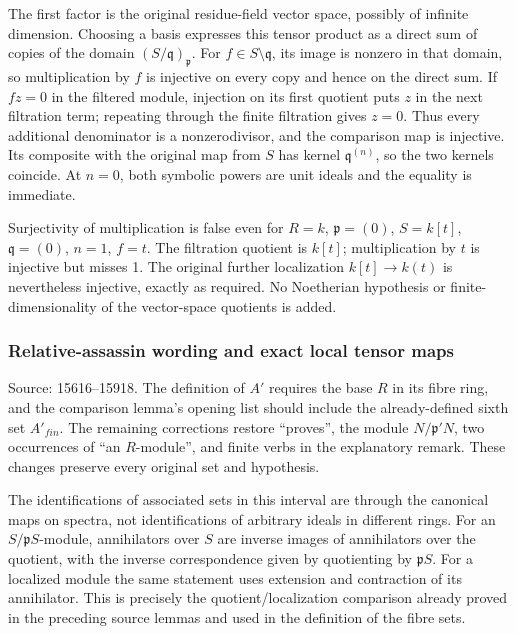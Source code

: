 The first factor is the original residue-field vector space, possibly of infinite dimension. Choosing a basis expresses this tensor product as a direct sum of copies of the domain \((S/\mathfrak q)_{\mathfrak p}\). For \(f\in S\setminus\mathfrak q\), its image is nonzero in that domain, so multiplication by \(f\) is injective on every copy and hence on the direct sum. If \(fz=0\) in the filtered module, injection on its first quotient puts \(z\) in the next filtration term; repeating through the finite filtration gives \(z=0\). Thus every additional denominator is a nonzerodivisor, and the comparison map is injective. Its composite with the original map from \(S\) has kernel \(\mathfrak q^{(n)}\), so the two kernels coincide. At \(n=0\), both symbolic powers are unit ideals and the equality is immediate.

Surjectivity of multiplication is false even for \(R=k\), \(\mathfrak p=(0)\), \(S=k[t]\), \(\mathfrak q=(0)\), \(n=1\), \(f=t\). The filtration quotient is \(k[t]\); multiplication by \(t\) is injective but misses 1. The original further localization \(k[t]\to k(t)\) is nevertheless injective, exactly as required. No Noetherian hypothesis or finite-dimensionality of the vector-space quotients is added.

\subsubsection{Relative-assassin wording and exact local tensor maps}\label{algebra-proof-005-relative-assassin-wording-and-exact-local-tensor-maps}

Source: 15616--15918. The definition of \(A'\) requires the base \(R\) in its fibre ring, and the comparison lemma's opening list should include the already-defined sixth set \(A'_{fin}\). The remaining corrections restore ``proves'', the module \(N/\mathfrak p'N\), two occurrences of ``an \(R\)-module'', and finite verbs in the explanatory remark. These changes preserve every original set and hypothesis.

The identifications of associated sets in this interval are through the canonical maps on spectra, not identifications of arbitrary ideals in different rings. For an \(S/\mathfrak pS\)-module, annihilators over \(S\) are inverse images of annihilators over the quotient, with the inverse correspondence given by quotienting by \(\mathfrak pS\). For a localized module the same statement uses extension and contraction of its annihilator. This is precisely the quotient/localization comparison already proved in the preceding source lemmas and used in the definition of the fibre sets.

